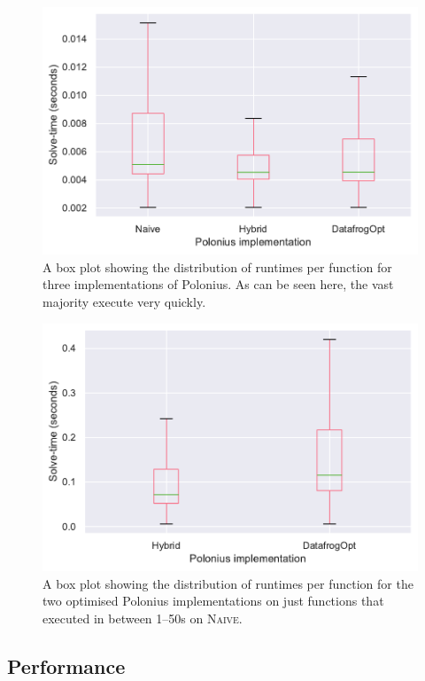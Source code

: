 \documentclass[11pt,a4paper,twoside,openany,draft]{report}
\begin{document}
\begin{figure}
  \includegraphics[width=0.9\linewidth]{Graphs/solvetimes_boxplot.pdf}
  \caption[Runtimes Per Function for Three Polonius Variants]{A box plot
    showing the distribution of runtimes per function for three
    implementations of Polonius. As can be seen here, the vast majority execute
    very quickly.}
  \label{fig:solvetimes}
\end{figure}


\begin{figure}
  \includegraphics[width=0.9\linewidth]{Graphs/solvetimes_boxplot_over_1s.pdf}
  \caption[Runtimes Per Function for Two Polonius Variants on Longer-Running
  Inputs]{A box plot showing the distribution of runtimes per function for the
    two optimised Polonius implementations on just functions that executed in
    between 1--50s on \textsc{Naive}.}
  \label{fig:solvetimes-long}
\end{figure}

\subsection{Performance}\label{sec:inputs:performance}
\end{document}
